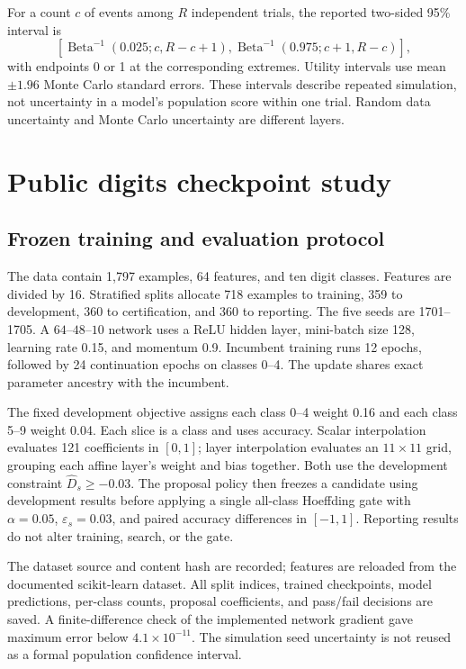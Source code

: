 \documentclass[11pt,letterpaper]{article}
\newcommand{\eps}{\varepsilon}
\begin{document}
For a count $c$ of events among $R$ independent trials, the reported two-sided 95\% interval is
\[
\left[\operatorname{Beta}^{-1}(0.025;c,R-c+1),
\operatorname{Beta}^{-1}(0.975;c+1,R-c)\right],
\]
with endpoints 0 or 1 at the corresponding extremes. Utility intervals use mean $\pm1.96$ Monte Carlo standard errors. These intervals describe repeated simulation, not uncertainty in a model's population score within one trial. Random data uncertainty and Monte Carlo uncertainty are different layers.

\section{Public digits checkpoint study}
\label{app:digits}
\subsection{Frozen training and evaluation protocol}
The data contain 1,797 examples, 64 features, and ten digit classes. Features are divided by 16. Stratified splits allocate 718 examples to training, 359 to development, 360 to certification, and 360 to reporting. The five seeds are 1701--1705. A $64$--$48$--$10$ network uses a ReLU hidden layer, mini-batch size 128, learning rate 0.15, and momentum 0.9. Incumbent training runs 12 epochs, followed by 24 continuation epochs on classes 0--4. The update shares exact parameter ancestry with the incumbent.

The fixed development objective assigns each class 0--4 weight 0.16 and each class 5--9 weight 0.04. Each slice is a class and uses accuracy. Scalar interpolation evaluates 121 coefficients in $[0,1]$; layer interpolation evaluates an $11\times11$ grid, grouping each affine layer's weight and bias together. Both use the development constraint $\widehat D_s\geq-0.03$. The proposal policy then freezes a candidate using development results before applying a single all-class Hoeffding gate with $\alpha=0.05$, $\eps_s=0.03$, and paired accuracy differences in $[-1,1]$. Reporting results do not alter training, search, or the gate.

The dataset source and content hash are recorded; features are reloaded from the documented scikit-learn dataset. All split indices, trained checkpoints, model predictions, per-class counts, proposal coefficients, and pass/fail decisions are saved. A finite-difference check of the implemented network gradient gave maximum error below $4.1\times10^{-11}$. The simulation seed uncertainty is not reused as a formal population confidence interval.
\end{document}
